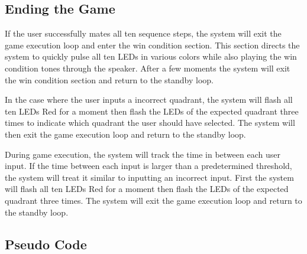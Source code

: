 \documentclass[12pt]{article}
\begin{document}
\subsection{Ending the Game}
If the user successfully mates all ten sequence steps, the system will exit the game execution loop and enter the win condition section. This section directs the system to quickly pulse all ten LEDs in various colors while also playing the win condition tones through the speaker. After a few moments the system will exit the win condition section and return to the standby loop.

In the case where the user inputs a incorrect quadrant, the system will flash all ten LEDs Red for a moment then flash the LEDs of the expected quadrant three times to indicate which quadrant the user should have selected. The system will then exit the game execution loop and return to the standby loop.

During game execution, the system will track the time in between each user input. If the time between each input is larger than a predetermined threshold, the system will treat it similar to inputting an incorrect input. First the system will flash all ten LEDs Red for a moment then flash the LEDs of the expected quadrant three times. The system will exit the game execution loop and return to the standby loop.

\subsection{Pseudo Code}
\end{document}
